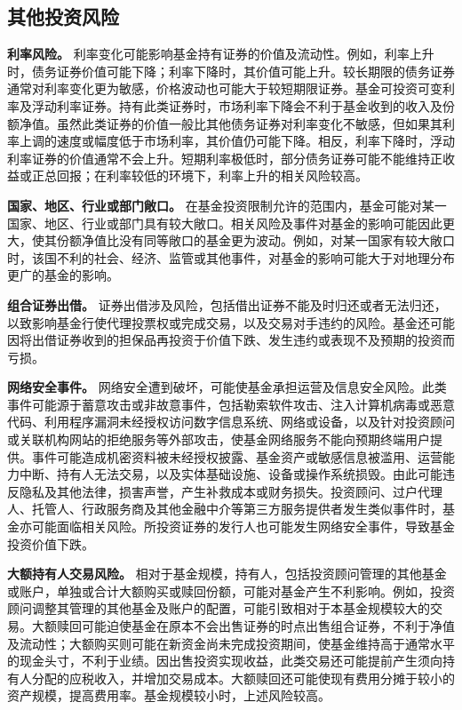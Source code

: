 \documentclass[UTF8,fontset=none,11pt,a4paper]{ctexart}
\begin{document}
\subsection*{其他投资风险}
\textbf{利率风险。} 利率变化可能影响基金持有证券的价值及流动性。例如，利率上升时，债务证券价值可能下降；利率下降时，其价值可能上升。较长期限的债务证券通常对利率变化更为敏感，价格波动也可能大于较短期限证券。基金可投资可变利率及浮动利率证券。持有此类证券时，市场利率下降会不利于基金收到的收入及份额净值。虽然此类证券的价值一般比其他债务证券对利率变化不敏感，但如果其利率上调的速度或幅度低于市场利率，其价值仍可能下降。相反，利率下降时，浮动利率证券的价值通常不会上升。短期利率极低时，部分债务证券可能不能维持正收益或正总回报；在利率较低的环境下，利率上升的相关\allowbreak\mbox{风险较高。}


\textbf{国家、地区、行业或部门敞口。} 在基金投资限制允许的范围内，基金可能对某一国家、地区、行业或部门具有较大敞口。相关风险及事件对基金的影响可能因此更大，使其份额净值比没有同等敞口的基金更为波动。例如，对某一国家有较大敞口时，该国不利的社会、经济、监管或其他事件，对基金的影响可能大于对地理分布更广的基\allowbreak\mbox{金的影响。}


\textbf{组合证券出借。} 证券出借涉及风险，包括借出证券不能及时归还或者无法归还，以致影响基金行使代理投票权或完成交易，以及交易对手违约的风险。基金还可能因将出借证券收到的担保品再投资于价值下跌、发生违约或表现不及预期的投\allowbreak\mbox{资而亏损。}


\textbf{网络安全事件。} 网络安全遭到破坏，可能使基金承担运营及信息安全风险。此类事件可能源于蓄意攻击或非故意事件，包括勒索软件攻击、注入计算机病毒或恶意代码、利用程序漏洞未经授权访问数字信息系统、网络或设备，以及针对投资顾问或关联机构网站的拒绝服务等外部攻击，使基金网络服务不能向预期终端用户提供。事件可能造成机密资料被未经授权披露、基金资产或敏感信息被滥用、运营能力中断、持有人无法交易，以及实体基础设施、设备或操作系统损毁。由此可能违反隐私及其他法律，损害声誉，产生补救成本或财务损失。投资顾问、过户代理人、托管人、行政服务商及其他金融中介等第三方服务提供者发生类似事件时，基金亦可能面临相关风险。所投资证券的发行人也可能发生网络安全事件，导致基金投资\allowbreak\mbox{价值下跌。}


\textbf{大额持有人交易风险。} 相对于基金规模，持有人，包括投资顾问管理的其他基金或账户，单独或合计大额购买或赎回份额，可能对基金产生不利影响。例如，投资顾问调整其管理的其他基金及账户的配置，可能引致相对于本基金规模较大的交易。大额赎回可能迫使基金在原本不会出售证券的时点出售组合证券，不利于净值及流动性；大额购买则可能在新资金尚未完成投资期间，使基金维持高于通常水平的现金头寸，不利于业绩。因出售投资实现收益，此类交易还可能提前产生须向持有人分配的应税收入，并增加交易成本。大额赎回还可能使现有费用分摊于较小的资产规模，提高费用率。基金规模较小时，上述\allowbreak\mbox{风险较高。}
\end{document}
